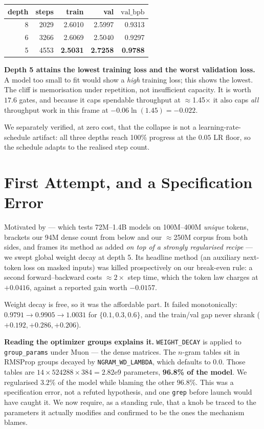 \documentclass{article}
\newcommand{\vb}{\mathrm{val\_bpb}}
\begin{document}
\begin{center}\begin{small}
\begin{tabular}{rrrrr}
\toprule
depth & steps & train & val & $\vb$ \\
\midrule
8 & 2029 & 2.6010 & 2.5997 & 0.9313 \\
6 & 3266 & 2.6069 & 2.5040 & 0.9297 \\
5 & 4553 & \textbf{2.5031} & \textbf{2.7258} & \textbf{0.9788} \\
\bottomrule
\end{tabular}
\end{small}\end{center}

\textbf{Depth 5 attains the lowest training loss and the worst validation loss.} A model too small to fit would show a \emph{high} training loss; this shows the lowest. The cliff is memorisation under repetition, not insufficient capacity. It is worth $17.6$ gates, and because it caps spendable throughput at $\approx$1.45$\times$ it also caps \emph{all} throughput work in this frame at $-0.06\ln(1.45) = -0.022$.

We separately verified, at zero cost, that the collapse is not a learning-rate-schedule artifact: all three depths reach 100\% progress at the $0.05$ LR floor, so the schedule adapts to the realised step count.

\section{First Attempt, and a Specification Error}
Motivated by \citet{dc2026} --- which tests 72M--1.4B models on 100M--400M \emph{unique} tokens, brackets our 94M dense count from below and our $\approx$250M corpus from both sides, and frames its method as added \emph{on top of a strongly regularised recipe} --- we swept global weight decay at depth 5. Its headline method (an auxiliary next-token loss on masked inputs) was killed prospectively on our break-even rule: a second forward--backward costs $\approx2\times$ step time, which the token law charges at $+0.0416$, against a reported gain worth $-0.0157$.

Weight decay is free, so it was the affordable part. It failed monotonically: $0.9791 \to 0.9905 \to 1.0031$ for $\{0.1, 0.3, 0.6\}$, and the train/val gap never shrank ($+0.192, +0.286, +0.206$).

\textbf{Reading the optimizer groups explains it.} \texttt{WEIGHT\_DECAY} is applied to \texttt{group\_params} under Muon --- the dense matrices. The $n$-gram tables sit in RMSProp groups decayed by \texttt{NGRAM\_WD\_LAMBDA}, which defaults to $0.0$. Those tables are $14 \times 524288 \times 384 = 2.82$e9 parameters, \textbf{96.8\% of the model}. We regularised $3.2$\% of the model while blaming the other $96.8$\%. This was a specification error, not a refuted hypothesis, and one \texttt{grep} before launch would have caught it. We now require, as a standing rule, that a knob be traced to the parameters it actually modifies and confirmed to be the ones the mechanism blames.
\end{document}
